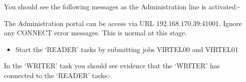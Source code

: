 \documentclass[letterpaper,10pt,english]{sphinxmanual}
\begin{document}
You should see the following messages as the Administration line is activated:-

\begin{sphinxVerbatim}[commandchars=\\\{\}]
         
     
        
            
\end{sphinxVerbatim}

The Administration portal can be access via URL 192.168.170.39:41001. Ignore any CONNECT error messages. This is normal at this stage.
\begin{itemize}
\item {} 
Start the ‘READER’ tasks by submitting jobs VIRTEL00 and VIRTEL01

\end{itemize}

In the ‘WRITER’ task you should see evidence that the ‘WRITER’ has connected to the ‘READER’ tasks:-
\end{document}
